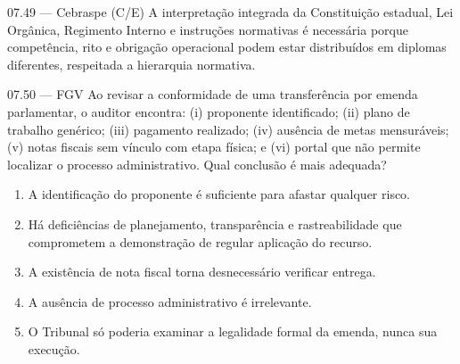 \begin{questao}{ 07.49 — Cebraspe (C/E)}
A interpretação integrada da Constituição estadual, Lei Orgânica, Regimento Interno e instruções normativas é necessária porque competência, rito e obrigação operacional podem estar distribuídos em diplomas diferentes, respeitada a hierarquia normativa.
\end{questao}

\begin{questao}{ 07.50 — FGV}
Ao revisar a conformidade de uma transferência por emenda parlamentar, o auditor encontra: (i) proponente identificado; (ii) plano de trabalho genérico; (iii) pagamento realizado; (iv) ausência de metas mensuráveis; (v) notas fiscais sem vínculo com etapa física; e (vi) portal que não permite localizar o processo administrativo. Qual conclusão é mais adequada?
\begin{enumerate}[label=\Alph*)]
\item A identificação do proponente é suficiente para afastar qualquer risco.
\item Há deficiências de planejamento, transparência e rastreabilidade que comprometem a demonstração de regular aplicação do recurso.
\item A existência de nota fiscal torna desnecessário verificar entrega.
\item A ausência de processo administrativo é irrelevante.
\item O Tribunal só poderia examinar a legalidade formal da emenda, nunca sua execução.
\end{enumerate}
\end{questao}
